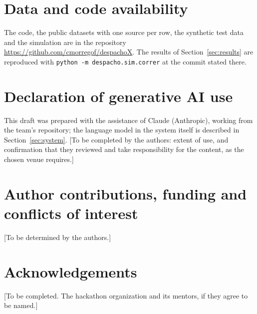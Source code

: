 \documentclass[11pt]{article}
\newcommand{\pend}[1]{\textcolor{red!60!black}{#1}}
\newcommand{\code}[1]{\texttt{\small #1}}
\begin{document}
\section*{Data and code availability}
The code, the public datasets with one source per row, the synthetic test data and the simulation are in the repository \url{https://github.com/cmorregof/despachoX}. The results of Section~\ref{sec:results} are reproduced with \code{python -m despacho.sim.correr} at the commit stated there. %

\section*{Declaration of generative AI use}
This draft was prepared with the assistance of Claude (Anthropic), working from the team's repository; the language model in the system itself is described in Section~\ref{sec:system}. \pend{[To be completed by the authors: extent of use, and confirmation that they reviewed and take responsibility for the content, as the chosen venue requires.]}

\section*{Author contributions, funding and conflicts of interest}
\pend{[To be determined by the authors.]}

\section*{Acknowledgements}
\pend{[To be completed. The hackathon organization and its mentors, if they agree to be named.]}



\end{document}
